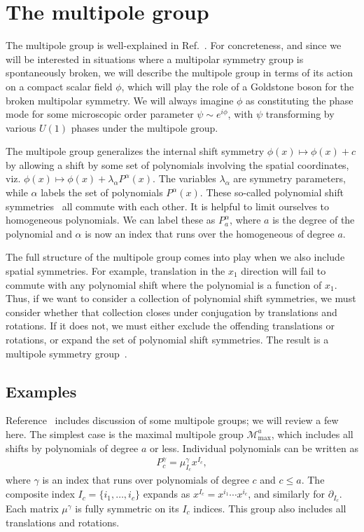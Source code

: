 \documentclass[pra,aps,twocolumn, amsfonts,amsmath,amssymb,nofootinbib,superscriptaddress]{revtex4-2}
\begin{document}
\section{The multipole group}
\label{multipolegroup}

The multipole group is well-explained in Ref.~\cite{Gromov2019}. For concreteness, and since we will be interested in situations where a multipolar symmetry group is spontaneously broken, we will describe the multipole group in terms of its action on a compact scalar field $\phi$, which will play the role of a Goldstone boson for the broken multipolar symmetry. We will always imagine $\phi$ as constituting the phase mode for some microscopic order parameter $\psi \sim e^{i\phi}$, with $\psi$ transforming by various $U(1)$ phases under the multipole group. 

 The multipole group generalizes the internal shift symmetry $\phi(x) \mapsto \phi (x) +c$ by allowing a shift by some set of polynomials involving the spatial coordinates, viz. $\phi (x) \mapsto \phi (x) + \lambda_\alpha P^\alpha(x)$. The variables $\lambda_\alpha$ are symmetry parameters, while $\alpha$ labels the set of polynomials $P^\alpha(x)$. These so-called polynomial shift symmetries~\cite{Griffin2015} all commute with each other. It is helpful to limit ourselves to homogeneous polynomials. We can label these as $P_a^{\alpha}$, where $a$ is the degree of the polynomial and $\alpha$ is now an index that runs over the homogeneous of degree $a$.

The full structure of the multipole group comes into play when we also include spatial symmetries. For example,  translation in the $x_1$ direction will fail to commute with any polynomial shift where the polynomial is a function of $x_1$. Thus, if we want to consider a collection of polynomial shift symmetries, we must consider whether that collection closes under conjugation by translations and rotations. If it does not, we must either exclude the offending translations or rotations, or expand the set of polynomial shift symmetries. The result is a multipole symmetry group~\cite{Gromov2019}.

\subsection{Examples} \label{sub:examples}

Reference~\cite{Gromov2019} includes discussion of some multipole groups; we will review a few here. The simplest case is the maximal multipole group $\mathcal{M}^a_\text{max}$, which includes all shifts by polynomials of degree $a$ or less. Individual polynomials can be written as
\begin{align}
P_c^{\gamma} = \mu^{\gamma}_{I_c}x^{I_c}, \label{eqn:basis}
\end{align}
where $\gamma$ is an index that runs over polynomials of degree $c$ and $c\le a$. The composite index $I_c = \{i_1,\dots,i_c\}$  expands as $x^{I_c}=x^{i_1}\cdots x^{i_c}$, and similarly for $\partial_{I_c}$. Each  matrix  $\mu^{\gamma}$ is fully symmetric on its $I_c$ indices. This group also includes all translations and rotations.
\end{document}
